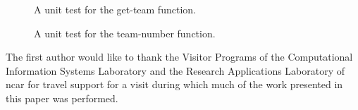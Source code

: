 


%





\begin{figure}
  
  \caption{A unit test for the get-team function.\label{fig:get-team-test}}
\end{figure}

%

\begin{figure}
  
  \caption{A unit test for the team-number function.\label{fig:team-number-test}}
\end{figure}

\begin{acks}
The first author would like to thank the Visitor Programs of the Computational Information Systems Laboratory and the Research Applications Laboratory of \gls{ncar} for travel support for a visit during which much of the work presented in this paper was performed.


\end{acks}
